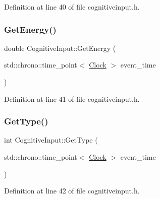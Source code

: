 Definition at line 40 of file cognitiveinput.\+h.

\mbox{\label{class_cognitive_input_a9bdb43198c1a36b97a6da125331bc927}} 
\subsubsection{\texorpdfstring{Get\+Energy()}{GetEnergy()}}
{\footnotesize\ttfamily double Cognitive\+Input\+::\+Get\+Energy (\begin{DoxyParamCaption}\item[{std\+::chrono\+::time\+\_\+point$<$ \mbox{\hyperlink{universe_8h_a0ef8d951d1ca5ab3cfaf7ab4c7a6fd80}{Clock}} $>$}]{event\+\_\+time }\end{DoxyParamCaption})\hspace{0.3cm}{\ttfamily [inline]}}



Definition at line 41 of file cognitiveinput.\+h.

\mbox{\label{class_cognitive_input_a0ad0919c7280b268493b27892bd7c784}} 
\subsubsection{\texorpdfstring{Get\+Type()}{GetType()}}
{\footnotesize\ttfamily int Cognitive\+Input\+::\+Get\+Type (\begin{DoxyParamCaption}\item[{std\+::chrono\+::time\+\_\+point$<$ \mbox{\hyperlink{universe_8h_a0ef8d951d1ca5ab3cfaf7ab4c7a6fd80}{Clock}} $>$}]{event\+\_\+time }\end{DoxyParamCaption})\hspace{0.3cm}{\ttfamily [inline]}}



Definition at line 42 of file cognitiveinput.\+h.

\mbox{\label{class_cognitive_input_a943605b820cc279533e19d24e11405c6}} 
